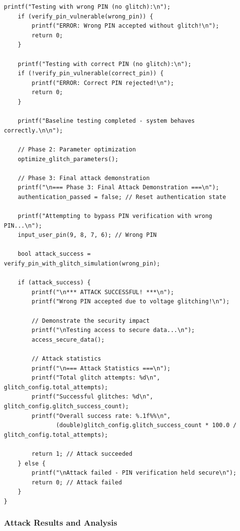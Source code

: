 \documentclass[12pt,a4paper]{article}
\begin{document}
\begin{lstlisting}[caption={Complete Voltage Glitching Attack System}]
    printf("Testing with wrong PIN (no glitch):\n");
    if (verify_pin_vulnerable(wrong_pin)) {
        printf("ERROR: Wrong PIN accepted without glitch!\n");
        return 0;
    }
    
    printf("Testing with correct PIN (no glitch):\n");
    if (!verify_pin_vulnerable(correct_pin)) {
        printf("ERROR: Correct PIN rejected!\n");
        return 0;
    }
    
    printf("Baseline testing completed - system behaves correctly.\n\n");
    
    // Phase 2: Parameter optimization
    optimize_glitch_parameters();
    
    // Phase 3: Final attack demonstration
    printf("\n=== Phase 3: Final Attack Demonstration ===\n");
    authentication_passed = false; // Reset authentication state
    
    printf("Attempting to bypass PIN verification with wrong PIN...\n");
    input_user_pin(9, 8, 7, 6); // Wrong PIN
    
    bool attack_success = verify_pin_with_glitch_simulation(wrong_pin);
    
    if (attack_success) {
        printf("\n*** ATTACK SUCCESSFUL! ***\n");
        printf("Wrong PIN accepted due to voltage glitching!\n");
        
        // Demonstrate the security impact
        printf("\nTesting access to secure data...\n");
        access_secure_data();
        
        // Attack statistics
        printf("\n=== Attack Statistics ===\n");
        printf("Total glitch attempts: %d\n", glitch_config.total_attempts);
        printf("Successful glitches: %d\n", glitch_config.glitch_success_count);
        printf("Overall success rate: %.1f%%\n", 
               (double)glitch_config.glitch_success_count * 100.0 / glitch_config.total_attempts);
        
        return 1; // Attack succeeded
    } else {
        printf("\nAttack failed - PIN verification held secure\n");
        return 0; // Attack failed
    }
}
\end{lstlisting}

\subsubsection{Attack Results and Analysis}
\end{document}
